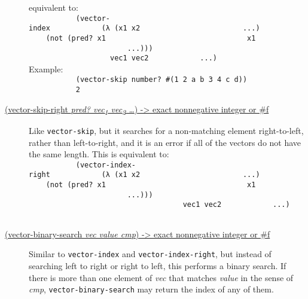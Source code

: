 \begin{description}
equivalent
to:\\[2\baselineskip]\texttt{\ \ \ \ \ \ \ \ \ \ \ (vector-index\ \ \ \ \ \ \ \ \ \ \ \ (λ\ (x1\ x2\ \ \ \ \ \ \ \ \ \ \ \ \ \ \ \ \ \ \ \ \ \ \ \ ...)\ \ \ \ \ \ \ \ \ \ \ \ \ \ (not\ (pred?\ x1\ \ \ \ \ \ \ \ \ \ \ \ \ \ \ \ \ \ \ \ \ \ \ \ \ \ \ \ \ \ \ \ \ x1\ \ \ \ \ \ \ \ \ \ \ \ \ \ \ \ \ \ \ \ \ \ \ \ \ \ \ \ \ \ \ \ \ \ ...)))\ \ \ \ \ \ \ \ \ \ \ \ ~~~~~~~~~\ \ \ \ \ \ \ \ \ \ \ \ ~~~~~~~~~\ \ \ \ \ \ \ \ \ \ \ \ vec1\ vec2\ \ \ \ \ \ \ \ \ \ \ \ ...)\ \ \ \ \ \ \ \ \ }\\[2\baselineskip]Example:\\[2\baselineskip]\texttt{\ \ \ \ \ \ \ \ \ \ \ (vector-skip\ number?\ \textquotesingle{}\#(1\ 2\ a\ b\ 3\ 4\ c\ d))\ \ \ \ \ \ \ \ \ }\\
\texttt{\ \ \ \ \ \ \ \ \ \ \ 2\ \ \ \ \ \ \ \ \ }\\[2\baselineskip]
\item[ \href{}{(vector-skip-right \emph{pred? vec\textsubscript{1}
vec\textsubscript{2} \ldots{}}) -\textgreater{} exact nonnegative
integer or \#f} ]
Like \texttt{vector-skip}, but it searches for a non-matching element
right-to-left, rather than left-to-right, and it is an error if all of
the vectors do not have the same length. This is equivalent
to:\\[2\baselineskip]\texttt{\ \ \ \ \ \ \ \ \ \ \ (vector-index-right\ \ \ \ \ \ \ \ \ \ \ \ (λ\ (x1\ x2\ \ \ \ \ \ \ \ \ \ \ \ \ \ \ \ \ \ \ \ \ \ \ \ ...)\ \ \ \ \ \ \ \ \ \ \ \ \ \ (not\ (pred?\ x1\ \ \ \ \ \ \ \ \ \ \ \ \ \ \ \ \ \ \ \ \ \ \ \ \ \ \ \ \ \ \ \ \ x1\ \ \ \ \ \ \ \ \ \ \ \ \ \ \ \ \ \ \ \ \ \ \ \ \ \ \ \ \ \ \ \ \ \ ...)))\ \ \ \ \ \ \ \ \ \ \ \ ~~~~~~~~~\ \ \ \ \ \ \ \ \ \ \ \ ~~~~~~~~~~\ \ \ \ \ \ \ \ \ \ \ \ ~~~~\ \ \ \ \ \ \ \ \ \ \ \ vec1\ vec2\ \ \ \ \ \ \ \ \ \ \ \ ...)\ \ \ \ \ \ \ \ \ }\\[2\baselineskip]
\item[ \href{}{(vector-binary-search \emph{vec value cmp})
-\textgreater{} exact nonnegative integer or \#f} ]
Similar to \texttt{vector-index} and \texttt{vector-index-right}, but
instead of searching left to right or right to left, this performs a
binary search. If there is more than one element of \emph{vec} that
matches \emph{value} in the sense of \emph{cmp},
\texttt{vector-binary-search} may return the index of any of them.


\end{description}
